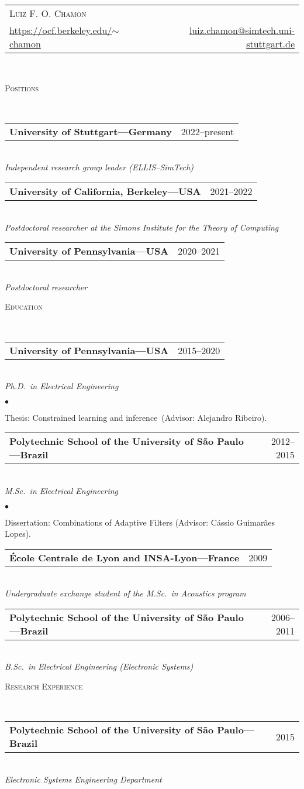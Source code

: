 \documentclass[a4paper,11pt]{article}
\makeatletter
\newcommand{\CVheader}[4]{
	\begin{tabular*}{\textwidth}{lr}
		\multicolumn{2}{l}{{\Huge \textsc{#1}} \vspace{1mm}}
		\\
		\begin{minipage}{0.5\textwidth}
			\href{#3}{#4}
		\end{minipage}
		&
		\begin{minipage}{0.5\textwidth}
			\flushright \href{mailto:#2}{#2}
		\end{minipage}
		\\
	\end{tabular*} \\ \vspace{1mm}
}
\newcommand{\CVheading}[1]{
	\vspace{10pt}
	{ \large
	\begin{minipage}{\textwidth}
		\textsc{#1 \vphantom{p\^{E}}}
	\end{minipage} } \\
	\vspace{5pt}
}
\newcommand{\CVsubheading}[2]{
	\begin{tabular*}{\textwidth}{l@{\extracolsep{\fill}}r}
		\textbf{#1} & #2 \\
	\end{tabular*} \\
}
\newcommand{\CVlist}{
	\begin{list}{$\bullet$}{
	\setlength{\itemsep}{0pt}
	\setlength{\parsep}{1pt}
	\setlength{\topsep}{1pt}
	\setlength{\partopsep}{0pt}
	\setlength{\leftmargin}{24pt}
	\setlength{\labelwidth}{1em} }
}
\newcommand{\CVlistend}{
	\end{list}
	\vspace{3pt}
}
\makeatother
\begin{document}
\CVheader%
{Luiz F. O. Chamon}%
{luiz.chamon@simtech.uni-stuttgart.de}%
{https://ocf.berkeley.edu/~chamon}{https://ocf.berkeley.edu/$\sim$chamon}




\CVheading{Positions}

\CVsubheading{University of Stuttgart---Germany}{2022--present}
\textit{Independent research group leader (ELLIS--SimTech)}
\vspace{3pt}


\CVsubheading{University of California, Berkeley---USA}{2021--2022}
\textit{Postdoctoral researcher at the Simons Institute for the Theory of Computing}
\vspace{3pt}

\CVsubheading{University of Pennsylvania---USA}{2020--2021}
\textit{Postdoctoral researcher}
\vspace{3pt}


\CVheading{Education}

\CVsubheading{University of Pennsylvania---USA}{2015--2020}
\textit{Ph.D.\ in Electrical Engineering}

	\CVlist

	\item Thesis: Constrained learning and inference~(Advisor: Alejandro Ribeiro).

	\CVlistend



\CVsubheading{Polytechnic School of the University of São Paulo---Brazil}{2012--2015}
\textit{M.Sc.\ in Electrical Engineering}

	\CVlist

	\item Dissertation: Combinations of Adaptive Filters (Advisor: C\'{a}ssio Guimar\~{a}es Lopes).

	\CVlistend


\CVsubheading{École Centrale de Lyon {\normalfont and} INSA-Lyon---France}{2009}
\textit{Undergraduate exchange student of the M.Sc.\ in Acoustics program}
\vspace{3pt}


\CVsubheading{Polytechnic School of the University of São Paulo---Brazil}{2006--2011}
\textit{B.Sc.\ in Electrical Engineering (Electronic Systems)}
\vspace{3pt}




\CVheading{Research Experience}


\CVsubheading{Polytechnic School of the University of São Paulo---Brazil}{2015}
\textit{Electronic Systems Engineering Department}
\end{document}

